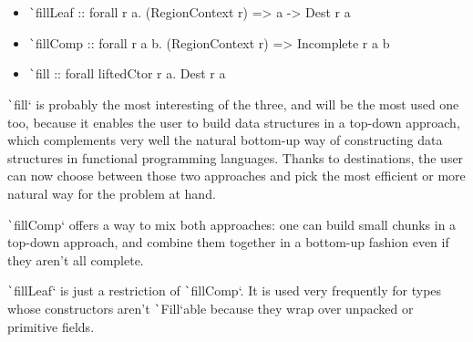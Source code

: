 \documentclass[english]{jflart}
\begin{document}
\begin{itemize}
  \item \texttt`fillLeaf :: forall r a. (RegionContext r) => a -> Dest r a %
  \item \texttt`fillComp :: forall r a b. (RegionContext r) => Incomplete r a b %
  \item \texttt`fill :: forall liftedCtor r a. Dest r a %
\end{itemize}

\texttt`fill` is probably the most interesting of the three, and will be the most used one too, because it enables the user to build data structures in a top-down approach, which complements very well the natural bottom-up way of constructing data structures in functional programming languages. Thanks to destinations, the user can now choose between those two approaches and pick the most efficient or more natural way for the problem at hand.

\texttt`fillComp` offers a way to mix both approaches: one can build small chunks in a top-down approach, and combine them together in a bottom-up fashion even if they aren't all complete.

\texttt`fillLeaf` is just a restriction of \texttt`fillComp`. It is used very frequently for types whose constructors aren't \texttt`Fill`able because they wrap over unpacked or primitive fields.
\end{document}
